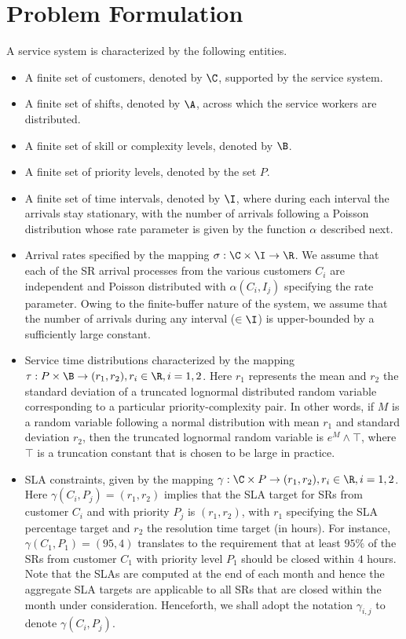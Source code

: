 \documentclass[11pt,letterpaper,english]{article}
\begin{document}
\section{Problem Formulation}
\label{sec:formulation}
A service system is characterized by the following entities.
\begin{itemize}[$\bullet$]
    \item A finite set of customers, denoted by $\C$, supported by the service
system.
    \item A finite set of shifts, denoted by $\A$, across which the service
workers are distributed.
    \item A finite set of skill or complexity levels, denoted by $\B$.
    \item A finite set of priority levels, denoted by the set $P$.
    \item A finite set of time intervals, denoted by $\I$, where during each
interval the arrivals stay stationary, with the number of arrivals following a
Poisson distribution whose rate parameter is given by the function $\alpha$
described next. 
    \item Arrival rates specified by the mapping $\sigma: \C \times \I
\rightarrow \R$. We assume that each of the SR arrival processes from the
various customers $C_i$ are independent and Poisson distributed with
$\alpha(C_i,I_j)$ specifying the rate parameter. Owing to the finite-buffer
nature of the system, we assume that the number of arrivals during any
interval ($\in \I$) is upper-bounded by a sufficiently large constant.
    \item Service time distributions characterized by the mapping $\tau: P \times \B \rightarrow (r_1, r_2), r_i \in \R, i=1,2$. Here $r_1$ represents the mean and $r_2$ the standard deviation of a truncated lognormal distributed random variable corresponding to a particular priority-complexity pair. In other words, if $M$ is a random variable following a normal distribution with mean $r_1$ and standard deviation $r_2$, then the truncated lognormal random variable is $e^M \wedge \top$, where $\top$ is a truncation constant that is chosen to be large in practice.     
    \item SLA constraints, given by the mapping $\gamma: \C \times P
\rightarrow (r_1, r_2), r_i \in \R, i = 1,2$. Here $\gamma(C_i,P_j) = (r_1,r_2)$
implies that the SLA target for SRs from customer $C_i$ and with priority $P_j$ is
$(r_1,r_2)$, with $r_1$ specifying the SLA percentage target and $r_2$ the
resolution time target (in hours). For instance, $\gamma(C_1,P_1) = (95,4)$
translates to the requirement that at least $95\%$ of the SRs from customer
$C_1$ with priority level $P_1$ should be closed within $4$ hours. Note that the
SLAs are computed at the end of each month and hence the aggregate SLA targets
are applicable to all SRs that are closed within the month under consideration.
Henceforth, we shall adopt the notation $\gamma_{i,j}$ to denote
$\gamma(C_i,P_j)$. 
\end{itemize}
\end{document}
